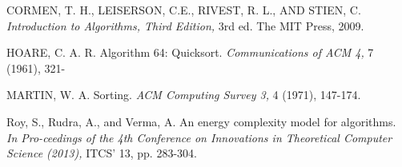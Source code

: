 \documentclass[a4paper, 11pt,twocolumn]{article}
\begin{document}
\begin{thebibliography}{9}
CORMEN, T. H., LEISERSON, C.E., RIVEST, R. L., AND STIEN, C.
\textit{Introduction to Algorithms, Third Edition,}
3rd ed. The MIT Press, 2009.

HOARE, C. A. R. Algorithm 64: Quicksort.
\textit{Communications of ACM 4,}
7 (1961), 321-

MARTIN, W. A. Sorting. 
\textit{ACM Computing Survey 3,}
4 (1971), 147-174.

Roy, S., Rudra, A., and Verma, A. An energy complexity model for algorithms. 
\textit{In Pro-ceedings of the 4th Conference on Innovations in Theoretical Computer Science (2013),}
ITCS' 13, pp. 283-304.
\end{thebibliography}
\end{document}

